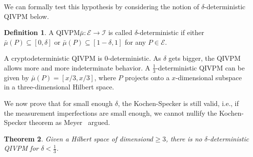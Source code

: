 \documentclass[english,reprint, aps, prl,superscriptaddress, showpacs,
showkeys, longbibliography, amsmath, amssymb]{revtex4-1}
\theoremstyle{plain}
\newtheorem{thm}{Theorem}
\theoremstyle{definition}
\newtheorem{definition}[thm]{Definition}
\newcommand{\events}{\ensuremath{\mathcal{E}}}
\newcommand{\nb}{\nolinebreak[1] }
\begin{document}
We can formally test this hypothesis by considering the notion of
$\delta$-deterministic QIVPM below. 

\begin{definition}\label{def:delta-deterministic}A QIVPM\nb$\bar{\mu}:\events\rightarrow\mathscr{I}$
  is called $\delta$-deterministic if either
  $\bar{\mu}\left(P\right)\subseteq\left[0,\delta\right]$ or
  $\bar{\mu}\left(P\right)\subseteq\left[1-\delta,1\right]$ for any
  $P\in\events$.\end{definition}

A cryptodeterministic QIVPM is $0$-deterministic.  As $\delta$ gets
bigger, the QIVPM allows more and more indeterminate behavior. A
$\frac{1}{3}$-deterministic QIVPM can be given by
$\bar{\mu}\left(P\right)=\left[x/3,x/3\right]$, where $P$ projects
onto a $x$-dimensional subspace in a three-dimensional Hilbert space.

We now prove that for small enough $\delta$, the Kochen-Specker is
still valid, i.e., if the measurement imperfections are small enough,
we cannot nullify the Kochen-Specker theorem as
Meyer~\cite{PhysRevLett.83.3751} argued. 

\begin{thm}\label{cor:Kochen-Specker-IVPM} Given a Hilbert space
  of dimension\nb$d\ge3$, there is no $\delta$-deterministic QIVPM for
  $\delta<\frac{1}{3}$.\end{thm}
\end{document}
